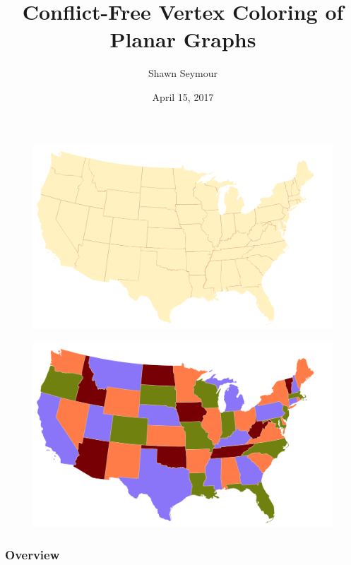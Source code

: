 \documentclass[xcolor=dvipsnames,aspectratio=1610]{beamer}
\title{Conflict-Free Vertex Coloring of Planar Graphs}
\date{April 15, 2017}
\author{Shawn Seymour}
\begin{document}
  \maketitle

  \begin{frame}
    \begin{figure}[h]
      \centering
      \includegraphics[width=14cm]{../figures/map-no-colors-1.pdf}
    \end{figure}
  \end{frame}

  \begin{frame}
    \begin{figure}[h]
      \centering
      \includegraphics[width=14cm]{../figures/map-colors.pdf}
    \end{figure}
  \end{frame}

  \begin{frame}
    \frametitle{Overview}
    \begin{multicols}{2}
      \tableofcontents
    \end{multicols}
  \end{frame}
\end{document}
